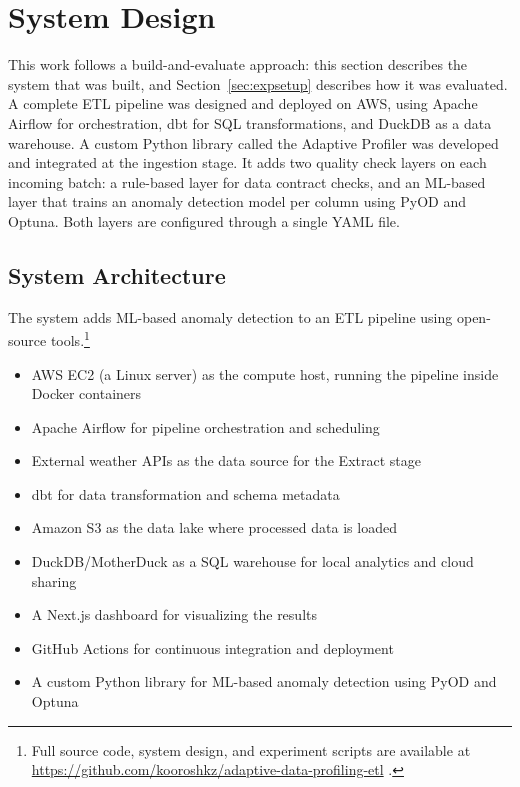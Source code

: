 \documentclass[12pt]{article}
\begin{document}
\section{System Design}\label{sec:systemdesign}

This work follows a build-and-evaluate approach: this section describes the system that was built, and Section~\ref{sec:expsetup} describes how it was evaluated. A complete ETL pipeline was designed and deployed on AWS, using Apache Airflow for orchestration, dbt for SQL transformations, and DuckDB as a data warehouse. A custom Python library called the Adaptive Profiler was developed and integrated at the ingestion stage. It adds two quality check layers on each incoming batch: a rule-based layer for data contract checks, and an ML-based layer that trains an anomaly detection model per column using PyOD and Optuna. Both layers are configured through a single YAML file.

\subsection{System Architecture}

The system adds ML-based anomaly detection to an ETL pipeline using open-source tools.\footnote{Full source code, system design, and experiment scripts are available at \url{https://github.com/kooroshkz/adaptive-data-profiling-etl} \cite{repoetl2026}.}

\begin{itemize}
  \item AWS EC2 (a Linux server) as the compute host, running the pipeline inside Docker containers
  \item Apache Airflow for pipeline orchestration and scheduling
  \item External weather APIs as the data source for the Extract stage
  \item dbt for data transformation and schema metadata
  \item Amazon S3 as the data lake where processed data is loaded
  \item DuckDB/MotherDuck as a SQL warehouse for local analytics and cloud sharing
  \item A Next.js dashboard for visualizing the results
  \item GitHub Actions for continuous integration and deployment
  \item A custom Python library for ML-based anomaly detection using PyOD and Optuna \cite{repoadaptiveprofiler2026}
\end{itemize}
\end{document}

